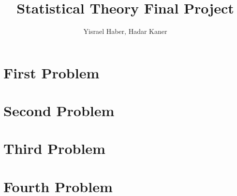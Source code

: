 \documentclass{article}
\title{Statistical Theory Final Project}
\author{Yisrael Haber, Hadar Kaner}
\begin{document}
\maketitle

\newtheorem{theorem}{Theorem}
\newtheorem{exercise}{Exercise}
\newtheorem{solution}{Solution Of}
\theoremstyle{definition}
\newtheorem{definition}{Definition}
\newtheorem{notation}{Notation}
\newtheorem{claim}{Claim}
\renewcommand\qedsymbol{$\blacksquare$}


\tableofcontents

\section{First Problem}


\section{Second Problem}


\section{Third Problem}


\section{Fourth Problem}

\end{document}

